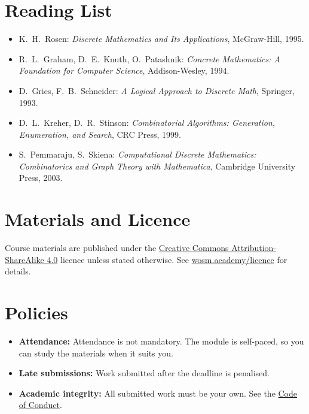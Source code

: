 \documentclass[11pt,a4paper]{article}
\begin{document}
\section{Reading List}
\begin{itemize}
  \item K.\ H.\ Rosen: \textit{Discrete Mathematics and Its Applications},
        McGraw-Hill, 1995.
  \item R.\ L.\ Graham, D.\ E.\ Knuth, O.\ Patashnik: \textit{Concrete Mathematics:
        A Foundation for Computer Science}, Addison-Wesley, 1994.
  \item D.\ Gries, F.\ B.\ Schneider: \textit{A Logical Approach to Discrete Math},
        Springer, 1993.
  \item D.\ L.\ Kreher, D.\ R.\ Stinson: \textit{Combinatorial Algorithms:
        Generation, Enumeration, and Search}, CRC Press, 1999.
  \item S.\ Pemmaraju, S.\ Skiena: \textit{Computational Discrete Mathematics:
        Combinatorics and Graph Theory with Mathematica}, Cambridge University
        Press, 2003.
\end{itemize}

\section{Materials and Licence}
Course materials are published under the
\href{https://creativecommons.org/licenses/by-sa/4.0/}{Creative Commons Attribution-ShareAlike 4.0}
licence unless stated otherwise. See \href{https://wosm.academy/licence/}{wosm.academy/licence} for details.

\section{Policies}
\begin{itemize}
  \item \textbf{Attendance:} Attendance is not mandatory. The module is self-paced, so you can study the materials when it suits you.
  \item \textbf{Late submissions:} Work submitted after the deadline is penalised.
  \item \textbf{Academic integrity:} All submitted work must be your own.
        See the \href{https://wosm.academy/code-of-conduct/}{Code of Conduct}.
\end{itemize}
\end{document}
